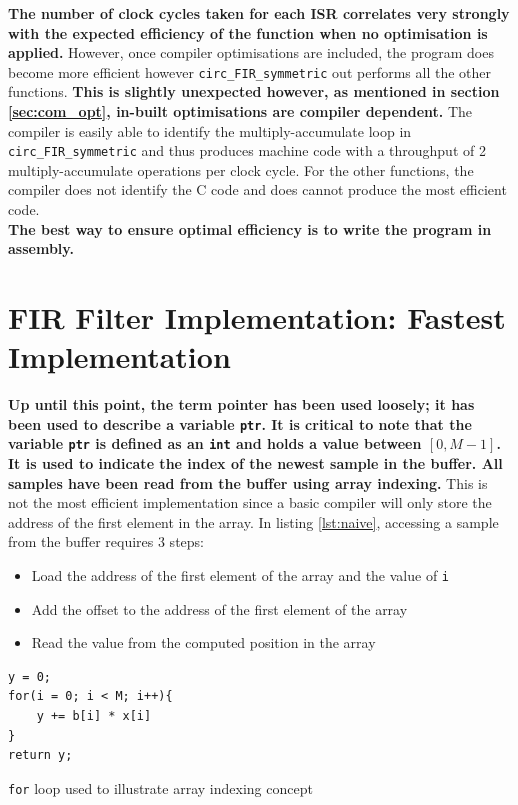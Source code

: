 \documentclass{article}
\begin{document}
\textbf{The number of clock cycles taken for each ISR correlates very strongly with the expected efficiency of the function when no optimisation is applied.} However, once compiler optimisations are included, the program does become more efficient however {\tt circ\_FIR\_symmetric} out performs all the other functions. \textbf{This is slightly unexpected however, as mentioned in section \ref{sec:com_opt}, in-built optimisations are compiler dependent.} The compiler is easily able to identify the multiply-accumulate loop in {\tt circ\_FIR\_symmetric} and thus produces machine code with a throughput of 2 multiply-accumulate operations per clock cycle. For the other functions, the compiler does not identify the C code and does cannot produce the most efficient code. \\

\textbf{The best way to ensure optimal efficiency is to write the program in assembly.}


\section{FIR Filter Implementation: Fastest Implementation}
\textbf{Up until this point, the term pointer has been used loosely; it has been used to describe a variable {\tt ptr}. It is critical to note that the variable {\tt ptr} is defined as an {\tt int} and holds a value between $[0, M-1]$. It is used to indicate the index of the newest sample in the buffer. All samples have been read from the buffer using array indexing.} This is not the most efficient implementation since a basic compiler will only store the address of the first element in the array.
In listing \ref{lst:naive}, accessing a sample from the buffer requires 3 steps:
\begin{itemize}
    \item Load the address of the first element of the array and the value of {\tt i}
    \item Add the offset to the address of the first element of the array
    \item Read the value from the computed position in the array
\end{itemize}

\begin{listing}[H]
\begin{verbatim}
y = 0;
for(i = 0; i < M; i++){
    y += b[i] * x[i]
}
return y;
\end{verbatim}
\caption{{\tt for} loop used to illustrate array indexing concept}
\label{lst:naive}
\end{listing}
\end{document}
